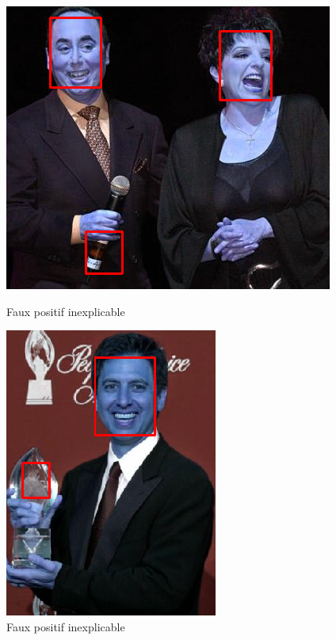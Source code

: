 \documentclass[a4paper,11pt]{article}
\begin{document}
	    \begin{figure}[H]
	        \centering
	        \begin{minipage}[c]{0.50\linewidth}
	            \begin{center}
	                \includegraphics[scale=0.45]{facenetFP3.png}
	                \caption{Faux positif inexplicable}
	            \end{center}
	        \end{minipage} \hfill
	        \begin{minipage}[c]{0.45\linewidth}
	            \begin{center}
	                \includegraphics[scale=0.45]{facenetFP4.png}
	                \caption{Faux positif inexplicable}
	            \end{center}
	        \end{minipage}
	    \end{figure}
	    
\end{document}
